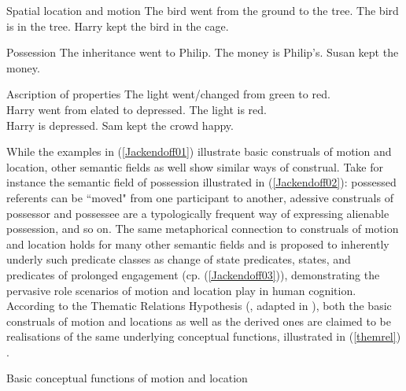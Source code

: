 \ea \label{Jackendoff01} Spatial location and motion
\ea  The bird went from the ground to the tree.
\ex The bird is in the tree.
\ex Harry kept the bird in the cage.
\z
\z

\ea \label{Jackendoff02} Possession
\ea The inheritance went to Philip.
\ex The money is Philip's.
\ex Susan kept the money.
\z
\z

\ea \label{Jackendoff03} Ascription of properties
\ea The light went/changed from green to red. \\
Harry went from elated to depressed.
\ex The light is red. \\
Harry is depressed.
\ex Sam kept the crowd happy.
\z
\z

While the examples in (\ref{Jackendoff01}) illustrate basic construals of motion and location, other semantic fields as well show similar ways of construal. Take for instance the semantic field of possession illustrated in (\ref{Jackendoff02}): possessed referents can be ``moved" from one participant to another, adessive construals of possessor and possessee are a typologically frequent way of expressing alienable possession, and so on. The same metaphorical connection to construals of motion and location holds for many other semantic fields and is proposed to inherently underly such predicate classes as change of state predicates, states, and predicates of prolonged engagement (cp. (\ref{Jackendoff03})), demonstrating the pervasive role scenarios of motion and location play in human cognition. According to the Thematic Relations Hypothesis (\citealt{gruber1965studies}, adapted in \citealt{Jackendoff1990}), both the basic construals of motion and locations as well as the derived ones are claimed to be realisations of the same underlying conceptual functions, illustrated in (\ref{themrel}) \citep[26]{Jackendoff1990}.

\ea \label{themrel}
Basic conceptual functions of motion and location
\z

\avmsortfont{\itshape}
{\scriptsize
\begin{avm}
\end{avm}
}

\smallskip
{\scriptsize
\begin{avm}
\end{avm}
}

